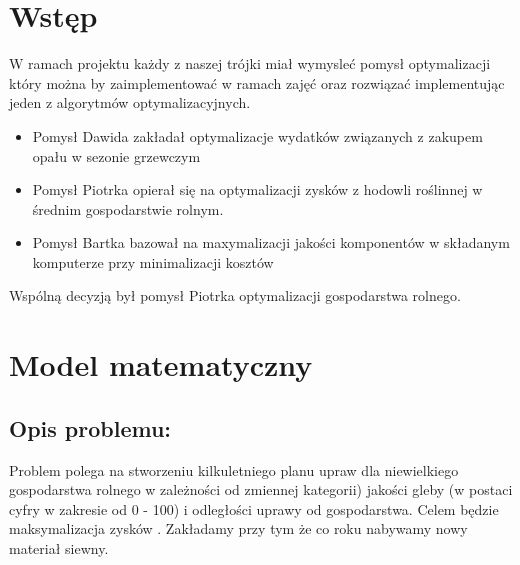 \documentclass[12pt,a4paper]{article}
\begin{document}
\tableofcontents

\section{Wstęp}
W ramach projektu każdy z naszej trójki miał wymysleć pomysł optymalizacji który można by zaimplementować w ramach zajęć oraz rozwiązać implementując jeden z algorytmów optymalizacyjnych.

\begin{itemize}
	\item Pomysł Dawida zakładał optymalizacje wydatków związanych z zakupem opału w sezonie grzewczym
	\item Pomysł Piotrka opierał się na optymalizacji zysków z hodowli roślinnej w średnim gospodarstwie rolnym.
	\item Pomysł Bartka bazował na maxymalizacji jakości komponentów w składanym komputerze przy minimalizacji kosztów
\end{itemize} 

Wspólną decyzją był pomysł Piotrka optymalizacji gospodarstwa rolnego.

\section{Model matematyczny}

	\subsection{Opis problemu:}
	Problem polega na stworzeniu kilkuletniego planu upraw dla niewielkiego gospodarstwa rolnego w zależności od zmiennej kategorii) jakości gleby (w postaci cyfry w zakresie od 0 - 100) i  odległości uprawy od gospodarstwa. Celem będzie maksymalizacja zysków . Zakładamy przy tym że co roku nabywamy nowy materiał siewny.
\end{document}
